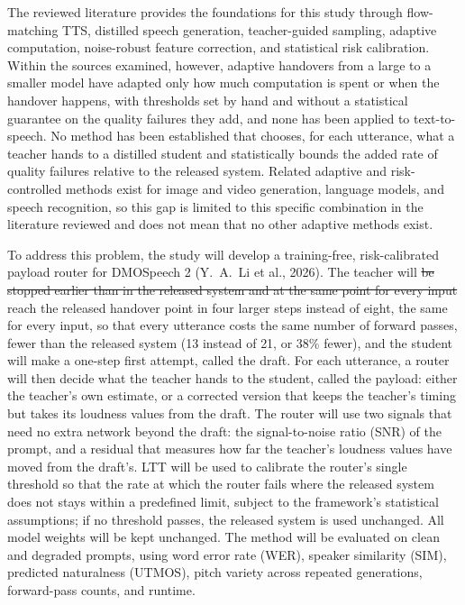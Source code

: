 \documentclass[11pt,a4paper]{article}
\newcommand{\chg}[2]{{\color{delcol}\sout{#1}}\,{\color{addcol}#2}}
\newcommand{\add}[1]{{\color{addcol}#1}}
\begin{document}
The reviewed literature provides the foundations for this study through flow-matching TTS, distilled speech generation, teacher-guided sampling, adaptive computation, noise-robust feature correction, and statistical risk calibration. Within the sources examined, however, adaptive handovers from a large to a smaller model have adapted only how much computation is spent or when the handover happens, with thresholds set by hand and without a statistical guarantee on the quality failures they add, and none has been applied to text-to-speech. No method has been established that chooses, for each utterance, what a teacher hands to a distilled student and statistically bounds the added rate of quality failures relative to the released system. Related adaptive and risk-controlled methods exist for image and video generation, language models, and speech recognition, so this gap is limited to this specific combination in the literature reviewed and does not mean that no other adaptive methods exist.

To address this problem, the study will develop a training-free, risk-calibrated payload router for DMOSpeech 2 (Y.\ A.\ Li et al., 2026). The teacher will \chg{be stopped earlier than in the released system and at the same point for every input}{reach the released handover point in four larger steps instead of eight, the same for every input}, so that every utterance costs the same number of forward passes, fewer than the released system\add{ (13 instead of 21, or 38\% fewer)}, and the student will make a one-step first attempt, called the draft. For each utterance, a router will then decide what the teacher hands to the student, called the payload: either the teacher's own estimate, or a corrected version that keeps the teacher's timing but takes its loudness values from the draft. The router will use two signals that need no extra network \add{beyond the draft}: the signal-to-noise ratio (SNR) of the prompt, and a residual that measures how far the teacher's loudness values have moved from the draft's. LTT will be used to calibrate the router's single threshold so that the rate at which the router fails where the released system does not stays within a predefined limit, subject to the framework's statistical assumptions; if no threshold passes, the released system is used unchanged. All model weights will be kept unchanged. The method will be evaluated on clean and degraded prompts, using word error rate (WER), speaker similarity (SIM), predicted naturalness (UTMOS), pitch variety across repeated generations, forward-pass counts, and runtime.
\end{document}
